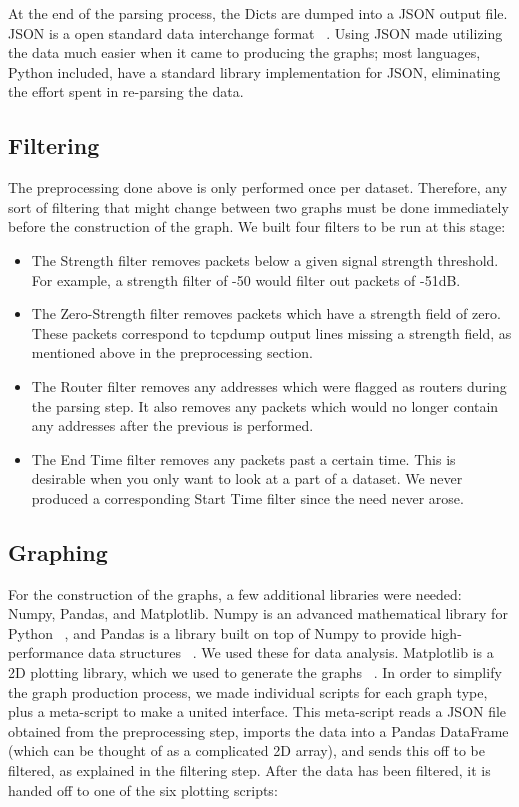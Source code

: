 At the end of the parsing process, the Dicts are dumped into a JSON output file.
JSON is a open standard data interchange format ~\cite{json}.
Using JSON made utilizing the data much easier when it came to producing the graphs; most languages, Python included, have a standard library implementation for JSON, eliminating the effort spent in re-parsing the data. %

\subsection{Filtering}
The preprocessing done above is only performed once per dataset.
Therefore, any sort of filtering that might change between two graphs must be done immediately before the construction of the graph.
We built four filters to be run at this stage:
\begin{itemize}
\item The Strength filter removes packets below a given signal strength threshold.
  For example, a strength filter of -50 would filter out packets of -51dB.
\item The Zero-Strength filter removes packets which have a strength field of zero.
  These packets correspond to tcpdump output lines missing a strength field, as mentioned above in the preprocessing section.
\item The Router filter removes any addresses which were flagged as routers during the parsing step.
  It also removes any packets which would no longer contain any addresses after the previous is performed.
\item The End Time filter removes any packets past a certain time.
  This is desirable when you only want to look at a part of a dataset.
  We never produced a corresponding Start Time filter since the need never arose.
\end{itemize}

\subsection{Graphing}
For the construction of the graphs, a few additional libraries were needed: Numpy, Pandas, and Matplotlib.
Numpy is an advanced mathematical library for Python ~\cite{numpy}, and Pandas is a library built on top of Numpy to provide high-performance data structures ~\cite{pandas}.
We used these for data analysis.
Matplotlib is a 2D plotting library, which we used to generate the graphs ~\cite{matplotlib}. 
In order to simplify the graph production process, we made individual scripts for each graph type, plus a meta-script to make a united interface.
This meta-script reads a JSON file obtained from the preprocessing step, imports the data into a Pandas DataFrame (which can be thought of as a complicated 2D array), and sends this off to be filtered, as explained in the filtering step.
After the data has been filtered, it is handed off to one of the six plotting scripts:

